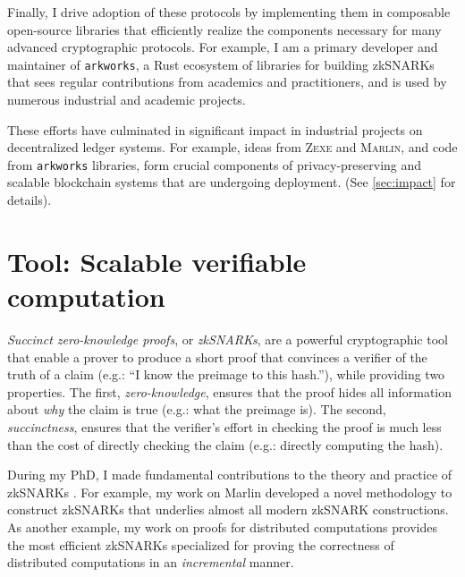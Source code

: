 \documentclass[11pt,letterpaper]{article}
\theoremstyle{definition} %
\theoremstyle{remark} %
\newcommand{\zexe}{\textsc{Zexe}}
\newcommand{\marlin}{\textsc{Marlin}}
\newcommand{\arkworks}{\texttt{arkworks}}
\begin{document}
Finally, I drive adoption of these protocols by implementing them in composable open-source libraries that efficiently realize the components necessary for many advanced cryptographic protocols. For example, I am a primary developer and maintainer of \arkworks{}, a Rust ecosystem of libraries for building zkSNARKs that sees regular contributions from academics and practitioners, and is used by numerous industrial and academic projects.

These efforts have culminated in significant impact in industrial projects on decentralized ledger systems. For example, ideas from \zexe{} and \marlin{}, and code from \arkworks{} libraries, form crucial components of privacy-preserving and scalable blockchain systems \cite{mina-general, aleo, celo, anoma} that are undergoing deployment. (See \cref{sec:impact} for details).


\section{Tool: Scalable verifiable computation}
\label{sec:took-zkp}

\emph{Succinct zero-knowledge proofs}, or \emph{zkSNARKs}, are a powerful cryptographic tool that enable a prover to produce a short proof that convinces a verifier of the truth of a claim (e.g.: ``I know the preimage to this hash.''), while providing two properties. 
The first, \emph{zero-knowledge}, ensures that the proof hides all information about \emph{why} the claim is true (e.g.: what the preimage is). 
The second, \emph{succinctness}, ensures that the verifier's effort in checking the proof is much less than the cost of directly checking the claim (e.g.: directly computing the hash).

During my PhD, I made fundamental contributions to the theory and practice of zkSNARKs \cite{ChiesaHMMVW20, BunzCMS20, BunzCLMS21, BunzMMTV21}.
For example, my work on Marlin \cite{ChiesaHMMVW20} developed a novel methodology to construct zkSNARKs that underlies almost all modern zkSNARK constructions.
As another example, my work on proofs for distributed computations \cite{BunzCMS20,BunzCLMS21} provides the most efficient zkSNARKs specialized for proving the correctness of distributed computations in an \emph{incremental} manner.
\end{document}
